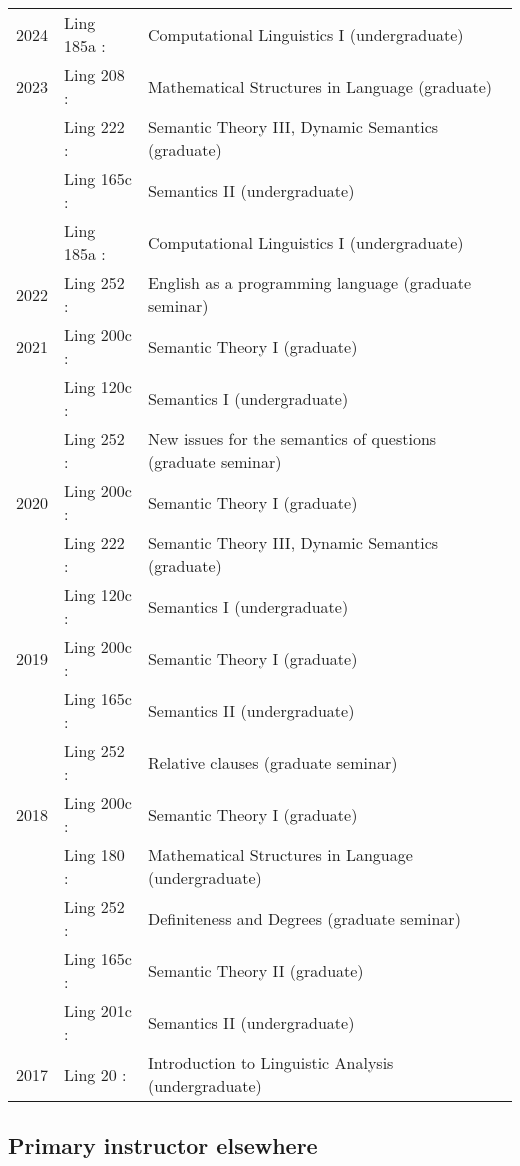 \documentclass[12pt]{article}
\renewcommand{\arraystretch}{1.25} %
\begin{document}
\begingroup
\renewcommand{\arraystretch}{1} %
\begin{longtable}{L@{}>{\lfstyle}p{0.11\textwidth}<{:}@{}p{0.78\textwidth}@{}}
  2024 & Ling 185a & Computational Linguistics I (undergraduate)
  \\[1ex]
  2023 & Ling 208  & Mathematical Structures in Language (graduate)\\
       & Ling 222  & Semantic Theory III, Dynamic Semantics (graduate)\\
       & Ling 165c & Semantics II (undergraduate)\\
       & Ling 185a & Computational Linguistics I (undergraduate)
  \\[1ex]
  2022 & Ling 252  & English as a programming language (graduate seminar)
  \\[1ex]
  2021 & Ling 200c & Semantic Theory I (graduate)\\
       & Ling 120c & Semantics I (undergraduate)\\
       & Ling 252  & New issues for the semantics of questions (graduate seminar)
  \\[1ex]
  2020 & Ling 200c & Semantic Theory I (graduate)\\
       & Ling 222  & Semantic Theory III, Dynamic Semantics (graduate)\\
       & Ling 120c & Semantics I (undergraduate)
  \\[1ex]
  2019 & Ling 200c & Semantic Theory I (graduate)\\
       & Ling 165c & Semantics II (undergraduate)\\
       & Ling 252  & Relative clauses (graduate seminar)
  \\[1ex]
  2018 & Ling 200c & Semantic Theory I (graduate)\\
       & Ling 180  & Mathematical Structures in Language (undergraduate)\\
       & Ling 252  & Definiteness and Degrees (graduate seminar)\\
       & Ling 165c & Semantic Theory II (graduate)\\
       & Ling 201c & Semantics II (undergraduate)
  \\[1ex]
  2017 & Ling 20   & Introduction to Linguistic Analysis (undergraduate)
\end{longtable}
\endgroup

\subsection*{Primary instructor elsewhere}%
\end{document}
